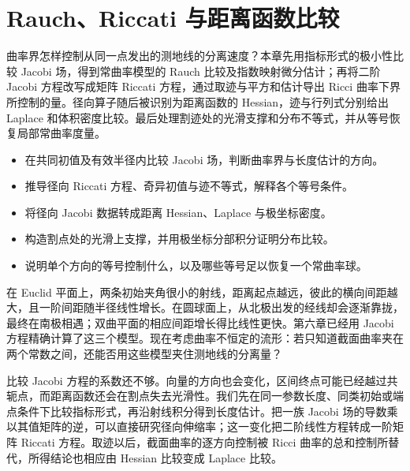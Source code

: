 
% 
% 

\chapter{Rauch、Riccati 与距离函数比较}
\label{g3:ch:07}

\begin{chapterabstract}
	曲率界怎样控制从同一点发出的测地线的分离速度？本章先用指标形式的极小性比较 Jacobi 场，得到常曲率模型的 Rauch 比较及指数映射微分估计；再将二阶 Jacobi 方程改写成矩阵 Riccati 方程，通过取迹与平方和估计导出 Ricci 曲率下界所控制的量。径向算子随后被识别为距离函数的 Hessian，迹与行列式分别给出 Laplace 和体积密度比较。最后处理割迹处的光滑支撑和分布不等式，并从等号恢复局部常曲率度量。
\end{chapterabstract}

\begin{learninggoals}
	\begin{itemize}
		\item 在共同初值及有效半径内比较 Jacobi 场，判断曲率界与长度估计的方向。
		\item 推导径向 Riccati 方程、奇异初值与迹不等式，解释各个等号条件。
		\item 将径向 Jacobi 数据转成距离 Hessian、Laplace 与极坐标密度。
		\item 构造割点处的光滑上支撑，并用极坐标分部积分证明分布比较。
		\item 说明单个方向的等号控制什么，以及哪些等号足以恢复一个常曲率球。
	\end{itemize}
\end{learninggoals}

在 Euclid 平面上，两条初始夹角很小的射线，距离起点越远，彼此的横向间距越大，且一阶间距随半径线性增长。在圆球面上，从北极出发的经线却会逐渐靠拢，最终在南极相遇；双曲平面的相应间距增长得比线性更快。第六章已经用 Jacobi 方程精确计算了这三个模型。现在考虑曲率不恒定的流形：若只知道截面曲率夹在两个常数之间，还能否用这些模型夹住测地线的分离量？

\ProseParagraphBreak

比较 Jacobi 方程的系数还不够。向量的方向也会变化，区间终点可能已经越过共轭点，而距离函数还会在割点失去光滑性。我们先在同一参数长度、同类初始或端点条件下比较指标形式，再沿射线积分得到长度估计。把一族 Jacobi 场的导数乘以其值矩阵的逆，可以直接研究径向伸缩率；这一变化把二阶线性方程转成一阶矩阵 Riccati 方程。取迹以后，截面曲率的逐方向控制被 Ricci 曲率的总和控制所替代，所得结论也相应由 Hessian 比较变成 Laplace 比较。

